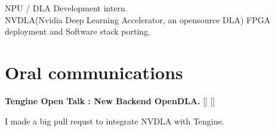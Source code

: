 \documentclass[a4paper,10pt]{article}
\begin{document}
\begin{adjustbox}{valign=t}
\begin{minipage}{0.6\textwidth}
\begin{description}
	NPU / DLA Development intern.\\
	
	NVDLA(Nvidia Deep Learning Accelerator, an opensource DLA) FPGA deployment and Software stack porting.
	
\end{description}

\section*{Oral communications}
\begin{description}
	\raggedright
	\item [\normalfont \textcolor{ColorOne}{Sep. 23th, 2021.}] 
	\textbf{Tengine Open Talk : New Backend OpenDLA.} [] []

	I made a big pull requst  to integrate NVDLA with Tengine.
\end{description}


\MySkip

\LastUpdate
\end{minipage}
\end{adjustbox}
\end{document}
